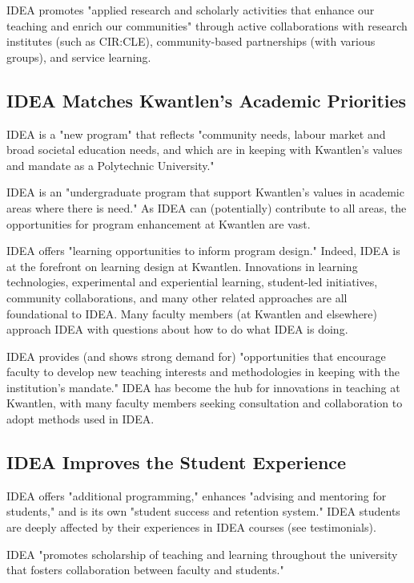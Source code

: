 \documentclass[letterpaper,10pt,headsepline]{scrreprt}
\begin{document}
IDEA promotes "applied research and scholarly activities that enhance our teaching and enrich our communities" through active collaborations with research institutes (such as CIR:CLE), community-based partnerships (with various groups), and service learning.

\subsection{IDEA Matches Kwantlen's Academic Priorities}

IDEA is a "new program" that reflects "community needs, labour market and broad societal education needs, and which are in keeping with Kwantlen’s values and mandate as a Polytechnic University."

IDEA is an "undergraduate program that support Kwantlen’s values in academic areas where there is need." As IDEA can (potentially) contribute to all areas, the opportunities for program enhancement at Kwantlen are vast.

IDEA offers "learning opportunities to inform program design." Indeed, IDEA is at the forefront on learning design at Kwantlen. Innovations in learning technologies, experimental and experiential learning, student-led initiatives, community collaborations, and many other related approaches are all foundational to IDEA. Many faculty members (at Kwantlen and elsewhere) approach IDEA with questions about how to do what IDEA is doing.

IDEA provides (and shows strong demand for) "opportunities that encourage faculty to develop new teaching interests and methodologies in keeping with the institution’s mandate." IDEA has become the hub for innovations in teaching at Kwantlen, with many faculty members seeking consultation and collaboration to adopt methods used in IDEA.

\subsection{IDEA Improves the Student Experience}

IDEA offers "additional programming," enhances "advising and mentoring for students," and is its own "student success and retention system." IDEA students are deeply affected by their experiences in IDEA courses (see testimonials).

IDEA "promotes scholarship of teaching and learning throughout the university that fosters collaboration between faculty and students."
\end{document}
